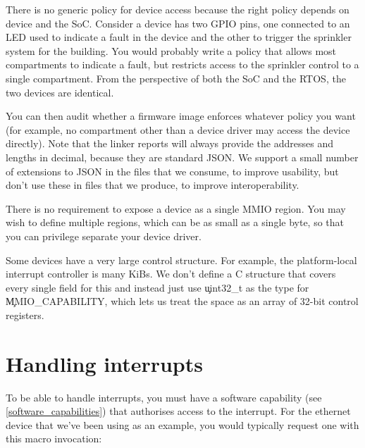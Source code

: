 \begin{jsonsnippet}
        {
          "kind": "MMIO",
          "length": 516,
          "start": 2550136832
        \},
\end{jsonsnippet}

\begin{note}
There is no generic policy for device access because the right policy depends on device and the SoC.
Consider a device has two GPIO pins, one connected to an LED used to indicate a fault in the device and the other to trigger the sprinkler system for the building.
You would probably write a policy that allows most compartments to indicate a fault, but restricts access to the sprinkler control to a single compartment.
From the perspective of both the SoC and the RTOS, the two devices are identical.
\end{note}

You can then audit whether a firmware image enforces whatever policy you want (for example, no compartment other than a device driver may access the device directly).
Note that the linker reports will always provide the addresses and lengths in decimal, because they are standard JSON.
We support a small number of extensions to JSON in the files that we consume, to improve usability, but don't use these in files that we produce, to improve interoperability.

There is no requirement to expose a device as a single MMIO region.
You may wish to define multiple regions, which can be as small as a single byte, so that you can privilege separate your device driver.

Some devices have a very large control structure.
For example, the platform-local interrupt controller is many KiBs.
We don't define a C structure that covers every single field for this and instead just use \c{uint32_t} as the type for \c{MMIO_CAPABILITY}, which lets us treat the space as an array of 32-bit control registers.

\section{Handling interrupts}

To be able to handle interrupts, you must have a software capability (see \ref{software_capabilities}) that authorises access to the interrupt.
For the ethernet device that we've been using as an example, you would typically request one with this macro invocation:

